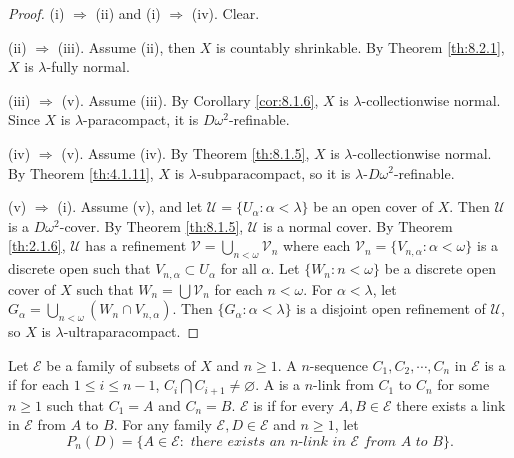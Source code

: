 \documentclass[jiang8iv.tex]{subfiles}
\begin{document}
\begin{proof}
(i) \(\Rightarrow\) (ii) and (i) \(\Rightarrow\) (iv). Clear.

(ii) \(\Rightarrow\) (iii). Assume (ii), then $X$ is countably shrinkable. By
Theorem \ref{th:8.2.1}, $X$ is $\lambda$-fully normal.

(iii) \(\Rightarrow\) (v). Assume (iii). By Corollary \ref{cor:8.1.6}, $X$ is  
$\lambda$-collectionwise normal. Since $X$ is $\lambda$-paracompact, it is 
$D\omega^2$-refinable.

(iv) \(\Rightarrow\) (v). Assume (iv). By Theorem \ref{th:8.1.5}, $X$ is  
$\lambda$-collectionwise normal. By Theorem \ref{th:4.1.11}, $X$ is $\lambda$-subparacompact, so it is $\lambda$-$D\omega^2$-refinable.

(v) \(\Rightarrow\) (i). Assume (v), and let 
\(\mathscr{U}=\{U_\alpha: \alpha < \lambda\}\) be an open cover of \(X\). 
Then $\mathscr{U}$ is a $D\omega^2$-cover.
By Theorem \ref{th:8.1.5}, $\mathscr{U}$ is a normal cover.
By Theorem \ref{th:2.1.6}, $\mathscr{U}$ has a refinement
$\mathscr{V}=\bigcup_{n<\omega}\mathscr{V}_n$ where each
$\mathscr{V}_n=\{V_{n, \alpha}:\alpha < \omega\}$ is a discrete open
such that $V_{n, \alpha}\subset U_\alpha$ for all $\alpha$.
Let $\{W_n: n<\omega\}$ be a discrete open cover of $X$ 
such that $W_n=\bigcup\mathscr{V}_n$ for each $n<\omega$. For $\alpha < \lambda$,
let $G_\alpha = \bigcup_{n < \omega}(W_n\cap V_{n,\alpha})$. 
Then $\{G_\alpha:\alpha < \lambda\}$ is a disjoint open refinement of $\mathscr{U}$,
so $X$ is  $\lambda$-ultraparacompact.
\end{proof} 

Let $\mathscr{E}$ be a family of subsets of $X$ and $n\ge 1$. A $n$-sequence 
$C_1, C_2, \cdots, C_n$ in $\mathscr{E}$ is a 
if for each $1 \le i \le n-1$, $C_i\bigcap C_{i+1}\ne \varnothing$.
A
 is a $n$-link from 
$C_1$ to $C_n$ for some $n\ge 1$ such that $C_1 = A$ and $C_n=B$.
$\mathscr{E}$ is
if for every $A, B\in \mathscr{E}$ there
exists a link in $\mathscr{E}$ from $A$ to $B$. For any family 
$\mathscr{E}, D\in \mathscr{E}$ and $n\ge 1$, let
$$P_n(D)=\{A\in \mathscr{E}: \textit{ there exists an $n$-link in } 
\mathscr{E} \textit{ from } A \textit{ to } B\}.$$
\end{document}
